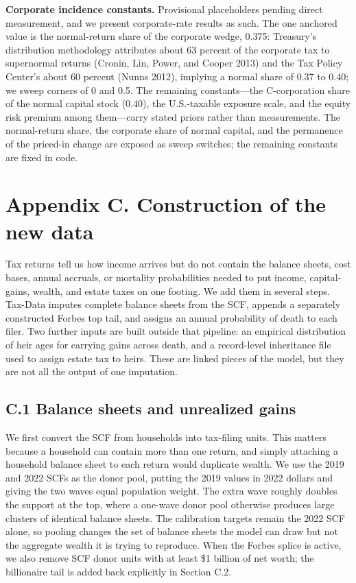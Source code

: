 \documentclass[10pt,twocolumn]{article}
\begin{document}
\textbf{Corporate incidence constants.} Provisional placeholders pending
direct measurement, and we present corporate-rate results as such. The one
anchored value is the normal-return share of the corporate wedge, 0.375:
Treasury's distribution methodology attributes about 63 percent of the
corporate tax to supernormal returns (Cronin, Lin, Power, and Cooper 2013) and
the Tax Policy Center's about 60 percent (Nunns 2012), implying a normal share
of 0.37 to 0.40; we sweep corners of 0 and 0.5. The remaining constants---the
C-corporation share of the normal capital stock (0.40), the U.S.-taxable
exposure scale, and the equity risk premium among them---carry stated priors
rather than measurements. The normal-return share, the corporate share of
normal capital, and the permanence of the priced-in change are exposed as
sweep switches; the remaining constants are fixed in code.

\section*{Appendix C. Construction of the new
data}

Tax returns tell us how income arrives but do not contain the balance
sheets, cost bases, annual accruals, or mortality probabilities needed
to put income, capital-gains, wealth, and estate taxes on one footing.
We add them in several steps. Tax-Data imputes complete balance
sheets from the SCF, appends a separately constructed Forbes top tail, and
assigns an annual probability of death to each filer. Two further inputs
are built outside that pipeline: an empirical
distribution of heir ages for carrying gains across death, and a
record-level inheritance file used to assign estate tax to heirs. These
are linked pieces of the model, but they are not all the output of one
imputation.

\subsection*{C.1 Balance sheets and unrealized
gains}

We first convert the SCF from households into tax-filing units. This
matters because a household can contain more than one return, and simply
attaching a household balance sheet to each return would duplicate
wealth. We use the 2019 and 2022 SCFs as the donor pool, putting the
2019 values in 2022 dollars and giving the two waves equal population
weight. The extra wave roughly doubles the support at the top, where a
one-wave donor pool otherwise produces large clusters of identical
balance sheets. The calibration targets remain the 2022 SCF alone, so
pooling changes the set of balance sheets the model can draw but not the
aggregate wealth it is trying to reproduce. When the Forbes splice is
active, we also remove SCF donor units with at least \$1 billion of net
worth; the billionaire tail is added back explicitly in Section C.2.
\end{document}
